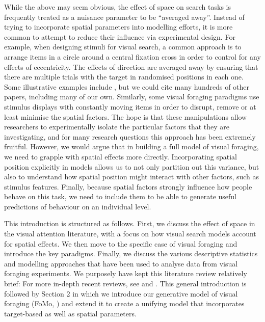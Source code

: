 \documentclass[man, floatsintext]{apa7}
\begin{document}
While the above may seem obvious, the effect of space on search tasks is frequently treated as a nuisance parameter to be ``averaged away''. Instead of trying to incorporate spatial parameters into modelling efforts, it is more common to attempt to reduce their influence via experimental design. For example, when designing stimuli for visual search, a common approach is to arrange items in a circle around a central fixation cross in order to control for any effects of eccentricity. The effects of direction are averaged away by ensuring that there are multiple trials with the target in randomised positions in each one. Some illustrative examples include \cite{wolfe2010midst, becker2010role, chen2006real, buetti2019predicting, hughes2024bayesian}, but we could cite many hundreds of other papers, including many of our own. Similarly, some visual foraging paradigms use stimulus displays with constantly moving items \citep{grossle2023testing} in order to disrupt, remove or at least minimise the spatial factors. The hope is that these manipulations allow researchers to experimentally isolate the particular factors that they are investigating, and for many research questions this approach has been extremely fruitful. However, we would argue that in building a full model of visual foraging, we need to grapple with spatial effects more directly. Incorporating spatial position explicitly in models allows us to not only partition out this variance, but also to understand how spatial position might interact with other factors, such as stimulus features. Finally, because spatial factors strongly influence how people behave on this task, we need to include them to be able to generate useful predictions of behaviour on an individual level. 

This introduction is structured as follows. First, we discuss the effect of space in the visual attention literature, with a focus on how visual search models account for spatial effects. We then move to the specific case of visual foraging and introduce the key paradigms. Finally, we discuss the various descriptive statistics and modelling approaches that have been used to analyse data from visual foraging experiments. We purposely have kept this literature review relatively brief: For more in-depth recent reviews, see \cite{bella2021} and \cite{kristjansson2025}. This general introduction is followed by Section 2 in which we introduce our generative model of visual foraging (FoMo, \cite{clarke2022foraging}) and extend it to create a unifying model that incorporates target-based as well as spatial parameters. 
  
\end{document}
